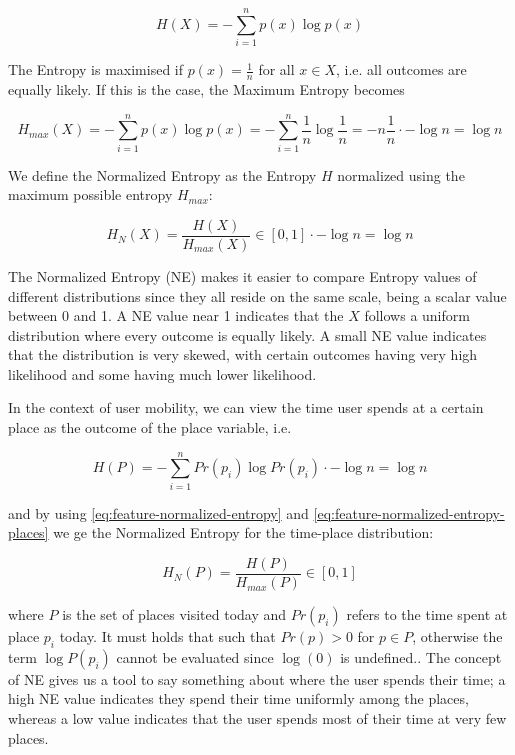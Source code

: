 \begin{equation}
\label{eq:feature-entropy}
H(X) = -\sum_{i=1}^{n} p(x) \log p(x)
\end{equation}

The Entropy is maximised if $p(x) = \frac{1}{n}$ for all $x \in X$, i.e. all outcomes are equally likely. If this is the case, the Maximum Entropy becomes 

\begin{equation}
\label{eq:feature-entropy-max}
H_{max}(X) = - \sum_{i=1}^{n} p(x) \log p(x) = - \sum_{i=1}^{n} \frac{1}{n} \log \frac{1}{n} = -n \frac{1}{n} \cdot -\log n = \log n 
\end{equation}

We define the Normalized Entropy as the Entropy $H$ normalized using the maximum possible entropy $H_{max}$:

\begin{equation}
\label{eq:feature-normalized-entropy}
H_N(X) = \frac{H(X)}{H_{max}(X)} \in [0,1]
\cdot -\log n = \log n 
\end{equation}

The Normalized Entropy (NE) makes it easier to compare Entropy values of different distributions since they all reside on the same scale, being a scalar value between  0 and 1. A NE value near 1 indicates that the $X$ follows a uniform distribution where every outcome is equally likely. A small NE value indicates that the distribution is very skewed, with certain outcomes having very high likelihood and some having much lower likelihood. 

In the context of user mobility, we can view the time user spends at a certain place as the outcome of the place variable, i.e. 

\begin{equation}
\label{eq:feature-normalized-entropy-places}
H(P) = - \sum_{i=1}^{n} Pr(p_i) \log Pr(p_i)
\cdot -\log n = \log n 
\end{equation}

and by using \eqref{eq:feature-normalized-entropy} and \eqref{eq:feature-normalized-entropy-places} we ge the Normalized Entropy for the time-place distribution:

\begin{equation}
\label{eq:feature-normalized-entropy}
H_N(P) = \frac{H(P)}{H_{max}(P)} \in [0,1]
\end{equation}

where $P$ is the set of places visited today and $Pr(p_i)$ refers to the time spent at place $p_i$ today. It must holds that such that $Pr(p) > 0$ for $p \in P$, otherwise the term $\log P(p_i)$ cannot be evaluated since $\log(0)$ is undefined.. The concept of NE gives us a tool to say something about where the user spends their time; a high NE value indicates they spend their time uniformly among the places, whereas a low value indicates that the user spends most of their time at very few places. 

